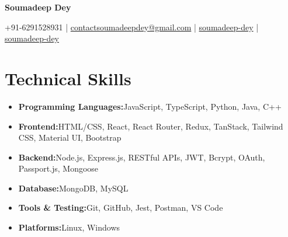 \documentclass[a4paper,10pt]{article}
\newcommand{\resumeItem}[2]{
  \item{
    \textbf{#1}{\hspace{1mm}#2 \vspace{-0.5mm}}
  }
}
\newcommand{\resumeSubItem}[2]{\resumeItem{#1}{#2}\vspace{-4pt}}
\newcommand{\resumeHeadingSkillStart}{\begin{itemize}[leftmargin=*,itemsep=1.7mm, rightmargin=2ex]}
\newcommand{\resumeHeadingSkillEnd}{\end{itemize}\vspace{-2mm}}
\newcommand{\socialicon}[1]{\raisebox{-0.05em}{\resizebox{!}{1em}{#1}}}
\newcommand{\headerfontiii}{\fontfamily{ppl}\selectfont} %
\begin{document}
\headerfontiii

\begin{center}
    {\Huge\textbf{Soumadeep Dey}}
\end{center}
\vspace{-5mm}

\begin{center}
    \small{
    {\faMobile} +91-6291528931 | {\faEnvelope} \href{mailto:contactsoumadeepdey@gmail.com}{contactsoumadeepdey@gmail.com} | 
    \socialicon{\faLinkedin} \href{https://linkedin.com/in/soumadeep-dey}{soumadeep-dey} | 
    \socialicon{\faGithub} \href{https://github.com/soumadeep-dey}{soumadeep-dey} 
    }
\end{center}
\vspace{-4mm}


\section{\textbf{Technical Skills}}
\vspace{0.8mm}
 \resumeHeadingSkillStart
  \resumeSubItem{Programming Languages:}
    {JavaScript, TypeScript, Python, Java, C++}
  \resumeSubItem{Frontend:}
    {HTML/CSS, React, React Router, Redux, TanStack, Tailwind CSS, Material UI, Bootstrap}
   \resumeSubItem{Backend:}
    {Node.js, Express.js, RESTful APIs, JWT, Bcrypt, OAuth, Passport.js, Mongoose}
  \resumeSubItem{Database:}
    {MongoDB, MySQL}
  \resumeSubItem{Tools \& Testing:}
    {Git, GitHub, Jest, Postman, VS Code}
  \resumeSubItem{Platforms:}
    {Linux, Windows }
 \resumeHeadingSkillEnd
 \vspace{-2mm}
\end{document}
